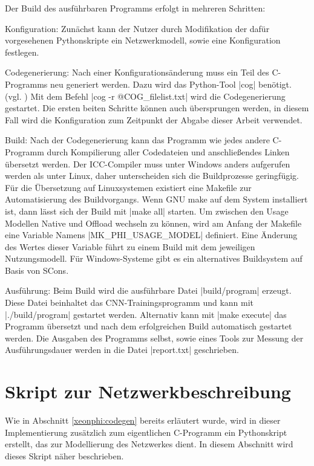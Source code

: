 \documentclass[../main.tex]{subfiles}
\begin{document}
Der Build des ausführbaren Programms erfolgt in mehreren Schritten: 
\begin{description}
\item{Konfiguration: } Zunächst kann der Nutzer durch Modifikation der dafür vorgesehenen Pythonskripte ein Netzwerkmodell, sowie eine Konfiguration festlegen. 
\item{Codegenerierung: } Nach einer Konfigurationsänderung muss ein Teil des C-Programms neu generiert werden. Dazu wird das Python-Tool |cog| benötigt. (vgl. \cite{COGdocumentation}) Mit dem Befehl |cog -r @COG_filelist.txt| wird die Codegenerierung gestartet. Die ersten beiten Schritte können auch übersprungen werden, in diesem Fall wird die Konfiguration zum Zeitpunkt der Abgabe dieser Arbeit verwendet. 
\item{Build: } Nach der Codegenerierung kann das Programm wie jedes andere C-Programm durch Kompilierung aller Codedateien und anschließendes Linken übersetzt werden. Der ICC-Compiler muss unter Windows anders aufgerufen werden als unter Linux, daher unterscheiden sich die Buildprozesse geringfügig. Für die Übersetzung auf Linuxsystemen existiert eine Makefile zur Automatisierung des Buildvorgangs. Wenn GNU make auf dem System installiert ist, dann lässt sich der Build mit |make all| starten. Um zwischen den Usage Modellen Native und Offload wechseln zu können, wird am Anfang der Makefile eine Variable Namens |MK_PHI_USAGE_MODEL| definiert. Eine Änderung des Wertes dieser Variable führt zu einem Build mit dem jeweiligen Nutzungsmodell. Für Windows-Systeme gibt es ein alternatives Buildsystem auf Basis von SCons. 
\item{Ausführung: } Beim Build wird die ausführbare Datei |build/program| erzeugt. Diese Datei beinhaltet das CNN-Trainingsprogramm und kann mit |./build/program| gestartet werden. Alternativ kann mit |make execute| das Programm übersetzt und nach dem erfolgreichen Build automatisch gestartet werden. Die Ausgaben des Programms selbst, sowie eines Tools zur Messung der Ausführungsdauer werden in die Datei |report.txt| geschrieben. 
\end{description}

\section{Skript zur Netzwerkbeschreibung} \label{xeonphi:netdesk}
Wie in Abschnitt \ref{xeonphi:codegen} bereits erläutert wurde, wird in dieser Implementierung zusätzlich zum eigentlichen C-Programm ein Pythonskript erstellt, das zur Modellierung des Netzwerkes dient. In diesem Abschnitt wird dieses Skript näher beschrieben. 
\end{document}
